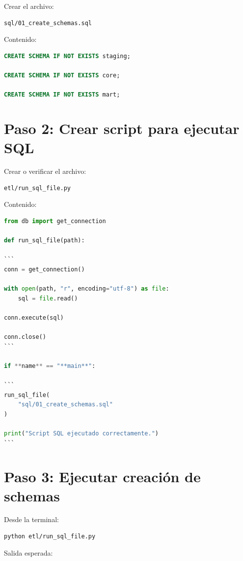 Crear el archivo:

\begin{verbatim}
sql/01_create_schemas.sql
\end{verbatim}

Contenido:

\begin{lstlisting}[language=SQL]
CREATE SCHEMA IF NOT EXISTS staging;

CREATE SCHEMA IF NOT EXISTS core;

CREATE SCHEMA IF NOT EXISTS mart;
\end{lstlisting}

\section{Paso 2: Crear script para ejecutar SQL}

Crear o verificar el archivo:

\begin{verbatim}
etl/run_sql_file.py
\end{verbatim}

Contenido:

\begin{lstlisting}[language=Python]
from db import get_connection

def run_sql_file(path):

```
conn = get_connection()

with open(path, "r", encoding="utf-8") as file:
    sql = file.read()

conn.execute(sql)

conn.close()
```

if **name** == "**main**":

```
run_sql_file(
    "sql/01_create_schemas.sql"
)

print("Script SQL ejecutado correctamente.")
```

\end{lstlisting}

\section{Paso 3: Ejecutar creación de schemas}

Desde la terminal:

\begin{lstlisting}[language=bash]
python etl/run_sql_file.py
\end{lstlisting}

Salida esperada:

